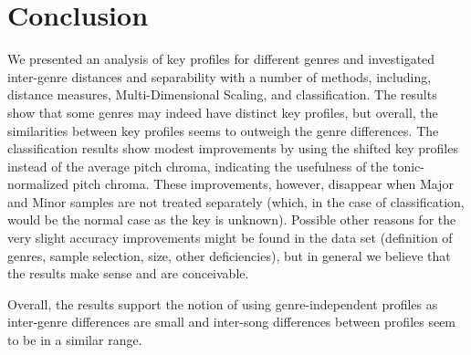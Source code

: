 \documentclass{article}
\begin{document}
\section{Conclusion}
We presented an analysis of key profiles for different genres and investigated inter-genre distances and separability with a number of methods, including, distance measures, Multi-Dimensional Scaling, and classification. The results show that some genres may indeed have distinct key profiles, but overall, the similarities between key profiles seems to outweigh the genre differences. The classification results show modest improvements by using the shifted key profiles instead of the average pitch chroma, indicating the usefulness of the tonic-normalized pitch chroma. These improvements, however, disappear when Major and Minor samples are not treated separately (which, in the case of classification, would be the normal case as the key is unknown). Possible other reasons for the very slight accuracy improvements might be found in the data set (definition of genres, sample selection, size, other deficiencies), but in general we believe that the results make sense and are conceivable.

Overall, the results support the notion of using genre-independent profiles as inter-genre differences are small and inter-song differences between profiles seem to be in a similar range. 

\end{document}
